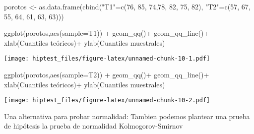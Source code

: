 \documentclass[
]{article}
\newenvironment{Shaded}{}{}
\newcommand{\AttributeTok}[1]{\textcolor[rgb]{0.49,0.56,0.16}{#1}}
\newcommand{\DecValTok}[1]{\textcolor[rgb]{0.25,0.63,0.44}{#1}}
\newcommand{\FunctionTok}[1]{\textcolor[rgb]{0.02,0.16,0.49}{#1}}
\newcommand{\NormalTok}[1]{#1}
\newcommand{\OtherTok}[1]{\textcolor[rgb]{0.00,0.44,0.13}{#1}}
\newcommand{\SpecialCharTok}[1]{\textcolor[rgb]{0.25,0.44,0.63}{#1}}
\newcommand{\StringTok}[1]{\textcolor[rgb]{0.25,0.44,0.63}{#1}}
\begin{document}
\begin{Shaded}
\begin{Highlighting}[]
\NormalTok{porotos }\OtherTok{\textless{}{-}} \FunctionTok{as.data.frame}\NormalTok{(}\FunctionTok{cbind}\NormalTok{(}\StringTok{"T1"}\OtherTok{=}\FunctionTok{c}\NormalTok{(}\DecValTok{76}\NormalTok{, }\DecValTok{85}\NormalTok{, }\DecValTok{74}\NormalTok{,}\DecValTok{78}\NormalTok{, }\DecValTok{82}\NormalTok{, }\DecValTok{75}\NormalTok{, }\DecValTok{82}\NormalTok{), }\StringTok{"T2"}\OtherTok{=}\FunctionTok{c}\NormalTok{(}\DecValTok{57}\NormalTok{, }\DecValTok{67}\NormalTok{, }\DecValTok{55}\NormalTok{, }\DecValTok{64}\NormalTok{, }\DecValTok{61}\NormalTok{, }\DecValTok{63}\NormalTok{, }\DecValTok{63}\NormalTok{)))}

\FunctionTok{ggplot}\NormalTok{(porotos,}\FunctionTok{aes}\NormalTok{(}\AttributeTok{sample=}\NormalTok{T1)) }\SpecialCharTok{+} 
  \FunctionTok{geom\_qq}\NormalTok{()}\SpecialCharTok{+}
  \FunctionTok{geom\_qq\_line}\NormalTok{()}\SpecialCharTok{+}
  \FunctionTok{xlab}\NormalTok{(}\StringTok{\textquotesingle{}Cuantiles teóricos\textquotesingle{}}\NormalTok{)}\SpecialCharTok{+}
  \FunctionTok{ylab}\NormalTok{(}\StringTok{\textquotesingle{}Cuantiles muestrales\textquotesingle{}}\NormalTok{)}
\end{Highlighting}
\end{Shaded}

\texttt{[image: hiptest\_files/figure-latex/unnamed-chunk-10-1.pdf]}

\begin{Shaded}
\begin{Highlighting}[]
\FunctionTok{ggplot}\NormalTok{(porotos,}\FunctionTok{aes}\NormalTok{(}\AttributeTok{sample=}\NormalTok{T2)) }\SpecialCharTok{+} 
  \FunctionTok{geom\_qq}\NormalTok{()}\SpecialCharTok{+}
  \FunctionTok{geom\_qq\_line}\NormalTok{()}\SpecialCharTok{+}
  \FunctionTok{xlab}\NormalTok{(}\StringTok{\textquotesingle{}Cuantiles teóricos\textquotesingle{}}\NormalTok{)}\SpecialCharTok{+}
  \FunctionTok{ylab}\NormalTok{(}\StringTok{\textquotesingle{}Cuantiles muestrales\textquotesingle{}}\NormalTok{)}
\end{Highlighting}
\end{Shaded}

\texttt{[image: hiptest\_files/figure-latex/unnamed-chunk-10-2.pdf]}

Una alternativa para probar normalidad: Tambien podemos plantear una
prueba de hipótesis la prueba de normalidad Kolmogorov-Smirnov

\begin{Shaded}
\end{Shaded}
\end{document}
